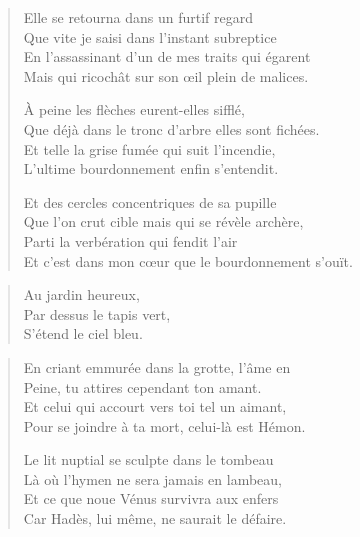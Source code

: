 \begin{verse}\quatrain
  Elle se retourna dans un furtif regard\\  %
  Que vite je saisi dans l’instant subreptice\\   %
  En l’assassinant d’un de mes traits qui égarent\\   %
  Mais qui ricochât sur son œil plein de malices. 

  À peine les flèches eurent-elles sifflé,\\   %
  Que déjà dans le tronc d’arbre elles sont fichées.\\   %
  Et telle la grise fumée  qui suit  l’incendie,\\   %
  L’ultime bourdonnement enfin s’entendit. 

  Et des cercles concentriques de sa pupille\\   %
  Que l’on crut cible mais qui se révèle archère,\\   %
  Parti la verbération qui fendit l’air\\   %
  Et c’est dans mon cœur que le bourdonnement s’ouït. 
\end{verse}



\begin{verse}\haiku
  Au jardin heureux,\\  %
  Par dessus le tapis  vert,\\  %
  S’étend le ciel bleu.
\end{verse}

\begin{verse}\quatrain
  En criant emmurée dans la grotte, l’âme en\\  %
  Peine, tu attires cependant ton amant.\\  %
  Et celui qui accourt vers toi tel un aimant,\\  %
  Pour se joindre à ta mort, celui-là est Hémon.

  Le lit nuptial se sculpte dans le tombeau\\  %
  Là où l’hymen ne sera jamais en lambeau,\\  %
  Et ce que noue Vénus survivra aux enfers\\  %
  Car Hadès, lui même, ne saurait le défaire. 
\end{verse}

